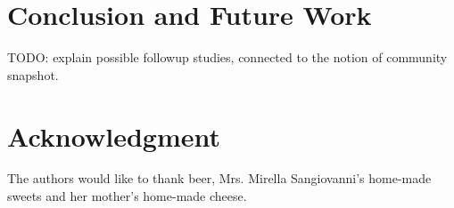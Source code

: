 \documentclass[conference]{IEEEtran}
\begin{document}
\section{Conclusion and Future Work}\label{conc}

TODO: explain possible followup studies, connected to the notion of community snapshot.\\

\section*{Acknowledgment}

The authors would like to thank beer, Mrs. Mirella Sangiovanni's home-made sweets and her mother's home-made cheese.




%
%
%




\end{document}
